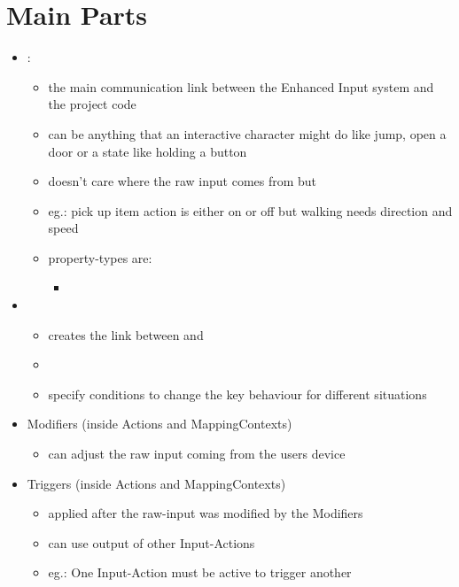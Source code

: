 \section{Main Parts}
    \begin{itemize}
        \item {}:
        \begin{itemize}
            \item the main communication link between the Enhanced Input system and the project code
            \item can be anything that an interactive character might do like jump, open a door or a state like holding a button
            \item doesn't care where the raw input comes from but 
            \item eg.: pick up item action is either on or off but walking needs direction and speed
            \item property-types are:
            \begin{itemize}
                \item 
            \end{itemize}
        \end{itemize}
        \item {}
        \begin{itemize}
            \item creates the link between  and 
            \item 
            \item specify conditions to change the key behaviour for different situations
        \end{itemize}
        \item Modifiers (inside Actions and MappingContexts)
        \begin{itemize}
            \item can adjust the raw input coming from the users device
        \end{itemize}
        \item Triggers (inside Actions and MappingContexts)
        \begin{itemize}
            \item applied after the raw-input was modified by the Modifiers
            \item can use output of other Input-Actions
            \item eg.: One Input-Action must be active to trigger another
        \end{itemize}
    \end{itemize}

